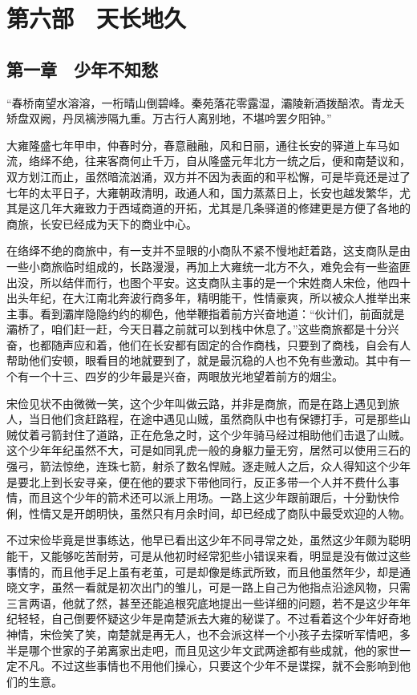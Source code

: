 \part{第六部　天长地久}

\chapter{第一章　少年不知愁}

“春桥南望水溶溶，一桁晴山倒碧峰。秦苑落花零露湿，灞陵新酒拨醅浓。青龙夭矫盘双阙，丹凤褵渉隔九重。万古行人离别地，不堪吟罢夕阳钟。”

大雍隆盛七年甲申，仲春时分，春意融融，风和日丽，通往长安的驿道上车马如流，络绎不绝，往来客商何止千万，自从隆盛元年北方一统之后，便和南楚议和，双方划江而止，虽然暗流汹涌，双方并不因为表面的和平松懈，可是毕竟还是过了七年的太平日子，大雍朝政清明，政通人和，国力蒸蒸日上，长安也越发繁华，尤其是这几年大雍致力于西域商道的开拓，尤其是几条驿道的修建更是方便了各地的商旅，长安已经成为天下的商业中心。

在络绎不绝的商旅中，有一支并不显眼的小商队不紧不慢地赶着路，这支商队是由一些小商旅临时组成的，长路漫漫，再加上大雍统一北方不久，难免会有一些盗匪出没，所以结伴而行，也图个平安。这支商队主事的是一个宋姓商人宋俭，他四十出头年纪，在大江南北奔波行商多年，精明能干，性情豪爽，所以被众人推举出来主事。看到灞岸隐隐约约的柳色，他举鞭指着前方兴奋地道：“伙计们，前面就是灞桥了，咱们赶一赶，今天日暮之前就可以到栈中休息了。”这些商旅都是十分兴奋，也都随声应和着，他们在长安都有固定的合作商栈，只要到了商栈，自会有人帮助他们安顿，眼看目的地就要到了，就是最沉稳的人也不免有些激动。其中有一个有一个十三、四岁的少年最是兴奋，两眼放光地望着前方的烟尘。

宋俭见状不由微微一笑，这个少年叫做云路，并非是商旅，而是在路上遇见到旅人，当日他们贪赶路程，在途中遇见山贼，虽然商队中也有保镖打手，可是那些山贼仗着弓箭封住了道路，正在危急之时，这个少年骑马经过相助他们击退了山贼。这个少年年纪虽然不大，可是如同乳虎一般的身躯力量无穷，居然可以使用三石的强弓，箭法惊绝，连珠七箭，射杀了数名悍贼。逐走贼人之后，众人得知这个少年是要北上到长安寻亲，便在他的要求下带他同行，反正多带一个人并不费什么事情，而且这个少年的箭术还可以派上用场。一路上这少年跟前跟后，十分勤快伶俐，性情又是开朗明快，虽然只有月余时间，却已经成了商队中最受欢迎的人物。

不过宋俭毕竟是世事练达，他早已看出这少年不同寻常之处，虽然这少年颇为聪明能干，又能够吃苦耐劳，可是从他初时经常犯些小错误来看，明显是没有做过这些事情的，而且他手足上虽有老茧，可是却像是练武所致，而且他虽然年少，却是通晓文字，虽然一看就是初次出门的雏儿，可是一路上自己为他指点沿途风物，只需三言两语，他就了然，甚至还能追根究底地提出一些详细的问题，若不是这少年年纪轻轻，自己倒要怀疑这少年是南楚派去大雍的秘谍了。不过看着这个少年好奇地神情，宋俭笑了笑，南楚就是再无人，也不会派这样一个小孩子去探听军情吧，多半是哪个世家的子弟离家出走吧，而且见这少年文武两途都有些成就，他的家世一定不凡。不过这些事情也不用他们操心，只要这个少年不是谍探，就不会影响到他们的生意。

